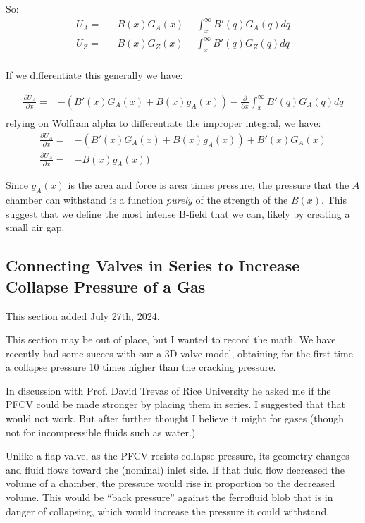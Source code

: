 \documentclass{asme2ej}
\begin{document}
So:
\begin{align}
  U_A = & - B(x) G_A(x) - \int_x^\infty B'(q) G_A(q) dq \\
  U_Z = & - B(x) G_Z(x) - \int_x^\infty B'(q) G_Z(q) dq \\
\end{align}

If we differentiate this generally we have:

\begin{align}
  \frac{\partial U_A}{\partial x}= & - (B'(x) G_A(x) + B(x) g_A(x ))  -  \frac{\partial }{\partial x}\int_x^\infty B'(q) G_A(q) dq \\
\end{align}
relying on Wolfram alpha to differentiate the improper integral, we have:
\begin{align}
  \frac{\partial U_A}{\partial x}= & - (B'(x) G_A(x) + B(x) g_A(x ))  +  B'(x) G_A(x) \\
  \frac{\partial U_A}{\partial x}= &  - B(x) g_A(x ))
\end{align}

Since $g_A(x)$ is the area and force is area times pressure, the pressure that the $A$ chamber
can withstand is a function {\em purely} of the strength of the $B(x)$. This suggest that we
define the most intense B-field that we can, likely by creating a small air gap.

\subsection{ Connecting Valves in Series to Increase Collapse Pressure of a Gas}

This section added July 27th, 2024.

This section may be out of place, but I wanted to record the math.
We have recently had some succes with our a 3D valve model, obtaining
for the first time a collapse pressure 10 times higher than the cracking
pressure.

In discussion with Prof. David Trevas of Rice University he asked me
if the PFCV could be made stronger by placing them in series.
I suggested that that would not work. But after further thought I
believe it might for gases (though not for incompressible fluids such as water.)

Unlike a flap valve, as the PFCV resists collapse pressure, its
geometry changes and fluid flows toward the (nominal) inlet side.
If that fluid flow decreased the volume of a chamber, the pressure
would rise in proportion to the decreased volume. This would be
``back pressure'' against the ferrofluid blob that is in danger
of collapsing, which would increase the pressure it could withstand.
\end{document}
